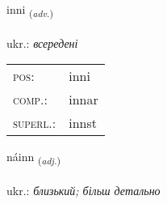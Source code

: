 \documentclass[frontgrid, backgrid]{flacards}\usepackage[]{graphicx}\usepackage[]{xcolor}
\begin{document}
\renewcommand{\flhead}{\vskip5pt \fboxsep=0pt {\small\bfseries\footnotesize Atviksorð | прислівник}}
\renewcommand{\fcfoot}{\vskip5pt \fboxsep=0pt \hspace{2pt}{\small\bfseries\footnotesize 1K}}

\renewcommand{\blhead}{\vskip5pt {\small\bfseries\footnotesize Atviksorð | прислівник }}
\renewcommand{\bcfoot}{\vskip5pt \hspace{2pt}{\small\bfseries\footnotesize 1K}}


{inni \small{\textsubscript{(\textit{adv.})}} \\[1ex] %
\textphonetic{[ɪnɪ]} \\
ukr.: \emph{всередені} \\  [2ex]
\renewcommand*{\arraystretch}{0.8}
\begin{tabular}{ll}
\textsc{pos}: & inni \\ 
\textsc{comp.}: & innar \\ 
\textsc{superl.}: & innst \\
\end{tabular}
}

\renewcommand{\flhead}{\vskip5pt \fboxsep=0pt {\small\bfseries\footnotesize Lýsingarorð | прикметник}}
\renewcommand{\fcfoot}{\vskip5pt \fboxsep=0pt \hspace{2pt}{\small\bfseries\footnotesize 1K}}

\renewcommand{\blhead}{\vskip5pt {\small\bfseries\footnotesize Lýsingarorð | прикметник }}
\renewcommand{\bcfoot}{\vskip5pt \hspace{2pt}{\small\bfseries\footnotesize 1K}}


{náinn \small{\textsubscript{(\textit{adj.})}} \\[1ex] %
\textphonetic{[nauːɪn]} \\
ukr.: \emph{близький; більш детально} \\  [2ex]
\renewcommand*{\arraystretch}{0.8}
}
\end{document}
